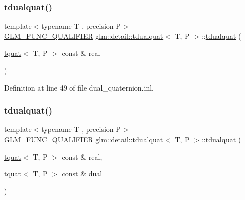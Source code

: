 \subsubsection{\texorpdfstring{tdualquat()}{tdualquat()}\hspace{0.1cm}{\footnotesize\ttfamily [2/6]}}
{\footnotesize\ttfamily template$<$typename T , precision P$>$ \\
\hyperlink{setup_8hpp_a33fdea6f91c5f834105f7415e2a64407}{G\+L\+M\+\_\+\+F\+U\+N\+C\+\_\+\+Q\+U\+A\+L\+I\+F\+I\+ER} \hyperlink{structglm_1_1detail_1_1tdualquat}{glm\+::detail\+::tdualquat}$<$ T, P $>$\+::\hyperlink{structglm_1_1detail_1_1tdualquat}{tdualquat} (\begin{DoxyParamCaption}\item[{\hyperlink{structglm_1_1detail_1_1tquat}{tquat}$<$ T, P $>$ const \&}]{real }\end{DoxyParamCaption})\hspace{0.3cm}{\ttfamily [explicit]}}



Definition at line 49 of file dual\+\_\+quaternion.\+inl.

\mbox{\label{structglm_1_1detail_1_1tdualquat_a3ba0cb0502e788715bd1b28547faaf78}} 
\subsubsection{\texorpdfstring{tdualquat()}{tdualquat()}\hspace{0.1cm}{\footnotesize\ttfamily [3/6]}}
{\footnotesize\ttfamily template$<$typename T , precision P$>$ \\
\hyperlink{setup_8hpp_a33fdea6f91c5f834105f7415e2a64407}{G\+L\+M\+\_\+\+F\+U\+N\+C\+\_\+\+Q\+U\+A\+L\+I\+F\+I\+ER} \hyperlink{structglm_1_1detail_1_1tdualquat}{glm\+::detail\+::tdualquat}$<$ T, P $>$\+::\hyperlink{structglm_1_1detail_1_1tdualquat}{tdualquat} (\begin{DoxyParamCaption}\item[{\hyperlink{structglm_1_1detail_1_1tquat}{tquat}$<$ T, P $>$ const \&}]{real,  }\item[{\hyperlink{structglm_1_1detail_1_1tquat}{tquat}$<$ T, P $>$ const \&}]{dual }\end{DoxyParamCaption})}



